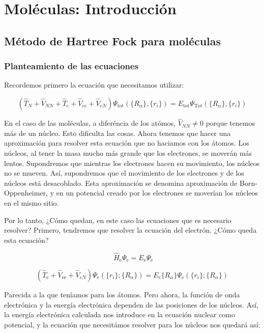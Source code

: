 \documentclass{tufte-book}
\begin{document}
\chapter{Moléculas: Introducción}
\section{Método de Hartree Fock para moléculas}
\subsection{Planteamiento de las ecuaciones}

Recordemos primero la ecuación que necesitamos utilizar:

\begin{equation}
    (\hat{T}_N + \hat{V}_{NN} + \hat{T}_e + \hat{V}_{ee} +\hat{V}_{eN})\Psi_\mathrm{tot}(\{R_\alpha\},\{r_i\}) 
    = E_\mathrm{tot}\Psi_\mathrm{Tot}(\{R_\alpha\},\{r_i\}) 
\end{equation}

En el caso de las moléculas, a diferéncia de los atómos,  $\hat{V}_{NN}\neq0$ porque tenemos más de un núcleo. Esto dificulta las cosas. Ahora tenemos que hacer una aproximación para resolver esta ecuación que no haciamos con los átomos. Los núcleos, al tener la masa mucho más grande que los electrones, se moverán más lentos. Supondremos que mientras los electrones hacen su movimiento, los núcleos no se mueven. Así, supondremos que el movimiento de los electrones y de los núcleos está desacoblado. Esta aproximación se denomina aproximación de Born-Oppenheimer, y en un potencial creado por los electrones se moverían los núcleos en el mismo sitio. 

Por lo tanto, ¿Cómo quedan, en este caso las ecuaciones que es necesario resolver? Primero, tendremos que resolver la ecuación del electrón. ¿Cómo queda esta ecuación?

\begin{equation} 
    \hat{H}_\mathrm{e}\Psi_\mathrm{e}=E_\mathrm{e}\Psi_\mathrm{e} 
\end{equation}

\begin{equation}
    (\hat{T}_\mathrm{e} + \hat{V}_\mathrm{ee} +\hat{V}_{eN})\Psi_\mathrm{e}(\{r_i\};\{R_\alpha\})
    = E_\mathrm{e}\{R_\alpha\}\Psi_\mathrm{e}(\{r_i\};\{R_\alpha\})
\end{equation}

Parecida a la que teníamos para los átomos. Pero ahora, la función de onda electrónica y la energía electrónica dependen de las posiciones de los núcleos. Así, la energía electrónica calculada nos introduce en la ecuación nuclear como potencial, y la ecuación que necesitámos resolver para los núcleos nos quedará así:
\end{document}
